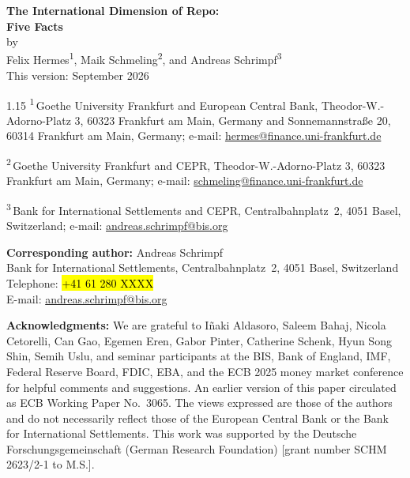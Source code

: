 \documentclass[12pt]{article}
\newcommand{\ph}[1]{\hl{#1}} %
\begin{document}
\begin{center}
\vspace*{0.4cm}
{\LARGE\textbf{The International Dimension of Repo:\\[6pt] Five Facts}}\\[0.8cm]
{\large by}\\[0.6cm]
{\large Felix Hermes\textsuperscript{1}, Maik Schmeling\textsuperscript{2}, and Andreas Schrimpf\textsuperscript{3}}\\[0.8cm]
{\normalsize This version: September 2026}
\end{center}

\vspace{0.8cm}

\begin{spacing}{1.15}
\noindent\textsuperscript{1}\,Goethe University Frankfurt and European Central Bank, Theodor-W.-Adorno-Platz 3, 60323 Frankfurt am Main, Germany and Sonnemannstraße 20, 60314 Frankfurt am Main, Germany; e-mail: \href{mailto:hermes@finance.uni-frankfurt.de}{hermes@finance.uni-frankfurt.de}

\medskip
\noindent\textsuperscript{2}\,Goethe University Frankfurt and CEPR, Theodor-W.-Adorno-Platz 3, 60323 Frankfurt am Main, Germany; e-mail: \href{mailto:schmeling@finance.uni-frankfurt.de}{schmeling@finance.uni-frankfurt.de}

\medskip
\noindent\textsuperscript{3}\,Bank for International Settlements and CEPR, Centralbahnplatz~2, 4051 Basel, Switzerland; e-mail: \href{mailto:andreas.schrimpf@bis.org}{andreas.schrimpf@bis.org}

\vspace{0.5cm}
\noindent\textbf{Corresponding author:} Andreas Schrimpf\\
Bank for International Settlements, Centralbahnplatz~2, 4051 Basel, Switzerland\\
Telephone: \ph{+41 61 280 XXXX}\\
E-mail: \href{mailto:andreas.schrimpf@bis.org}{andreas.schrimpf@bis.org}

\vspace{0.5cm}
\noindent\textbf{Acknowledgments:}
We are grateful to I\~{n}aki Aldasoro, Saleem Bahaj, Nicola Cetorelli, Can Gao, Egemen Eren, Gabor Pinter, Catherine Schenk, Hyun Song Shin, Semih Uslu, and seminar participants at the BIS, Bank of England, IMF, Federal Reserve Board, FDIC, EBA, and the ECB 2025 money market conference for helpful comments and suggestions.
An earlier version of this paper circulated as ECB Working Paper No.~3065.
The views expressed are those of the authors and do not necessarily reflect those of the European Central Bank or the Bank for International Settlements.
This work was supported by the Deutsche Forschungsgemeinschaft (German Research Foundation) [grant number SCHM 2623/2-1 to M.S.].
\end{spacing}
\end{document}
